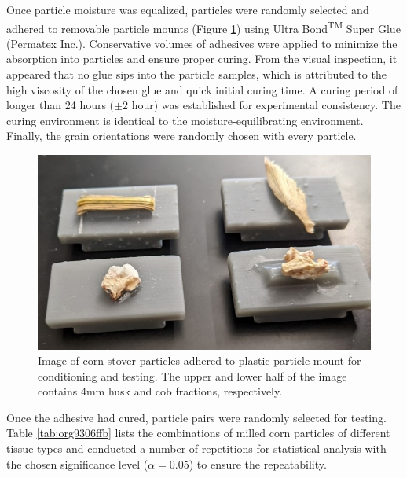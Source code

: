 \documentclass[xcolor=dvipsnames,10pt,hidelinks]{article}
\begin{document}
Once particle moisture was equalized, particles were randomly selected and adhered to removable particle mounts (Figure \ref{fig:orgc72fb23}) using Ultra Bond\textsuperscript{TM} Super Glue (Permatex Inc.).
Conservative volumes of adhesives were applied to minimize the absorption into particles and ensure proper curing.
From the visual inspection, it appeared that no glue sips into the particle samples,
which is attributed to the high viscosity of the chosen glue and quick initial curing time.
A curing period of longer than 24 hours (\(\pm 2\) hour) was established for experimental consistency.
The curing environment is identical to the moisture-equilibrating environment.
Finally, the grain orientations were randomly chosen with every particle.

\begin{figure}[htbp]
\centering
\includegraphics[width=.9\linewidth]{figures/image4.jpg}
\caption{\label{fig:orgc72fb23}Image of corn stover particles adhered to plastic particle mount for conditioning and testing. The upper and lower half of the image contains 4mm husk and cob fractions, respectively.}
\end{figure}

Once the adhesive had cured, particle pairs were randomly selected for testing.
Table \ref{tab:org9306ffb} lists the combinations of milled corn particles of different tissue types and conducted a number of repetitions for statistical analysis with the chosen significance level (\(\alpha = 0.05\)) to ensure the repeatability.
\end{document}
